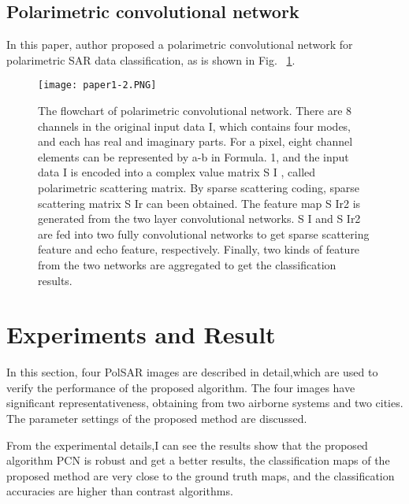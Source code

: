 \documentclass[10pt,twocolumn,letterpaper]{article}
\begin{document}
\subsection{Polarimetric convolutional network}
In this paper, author proposed a polarimetric convolutional network for polarimetric SAR data classification, as is shown in Fig. ~\ref{fig:polarimetric}.
\begin{figure}[htb]
\centering
\texttt{[image: paper1-2.PNG]}
\caption{The flowchart of polarimetric convolutional network. There are 8 channels in the original input data I, which contains four modes, and each has real
and imaginary parts. For a pixel, eight channel elements can be represented by a-b in Formula. 1, and the input data I is encoded into a complex value matrix
S I , called polarimetric scattering matrix. By sparse scattering coding, sparse scattering matrix S Ir can been obtained. The feature map S Ir2 is generated
from the two layer convolutional networks. S I and S Ir2 are fed into two fully convolutional networks to get sparse scattering feature and echo feature,
respectively. Finally, two kinds of feature from the two networks are aggregated to get the classification results.}
\label{fig:polarimetric}
\end{figure}

\section{Experiments and Result}
	In this section, four PolSAR images are described in detail,which are used to verify the performance of the proposed algorithm. The four images have significant representativeness, obtaining from two airborne systems and two cities. The parameter settings of the proposed method are discussed.
	
	From the experimental details,I can see the results show that the proposed algorithm PCN is robust and get a better results, the classification maps of the proposed method are very close to the ground truth maps, and the
classification accuracies are higher than contrast algorithms.





{\small


}
\end{document}
